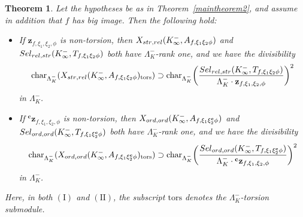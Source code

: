 \documentclass[10pt,letterpaper]{amsart}
\theoremstyle{plain}
\newtheorem{thm}{Theorem}[subsection] %
\theoremstyle{definition}
\theoremstyle{definition}
\theoremstyle{plain}
\theoremstyle{plain}
\theoremstyle{plain}
\theoremstyle{remark}
\numberwithin{equation}{section}
\newcommand{\cc}{\mathbf{c}}
\newcommand{\Sel}{Sel}
\newcommand{\relstr}{{{\rm rel},{\rm str}}}
\newcommand{\strrel}{{{\rm str},{\rm rel}}}
\newcommand{\ord}{{{\rm ord},{\rm ord}}}
\def\Sel{{\rm Sel}}
\begin{document}
\begin{thm}\label{thm:IMC-general}
Let the hypotheses be as in Theorem~\ref{maintheorem2}, and assume in addition that $f$ has big image. Then the following hold:
\begin{itemize}
\item[(I)] If $\mathbf{z}_{f,\xi_1,\xi_2,\phi}$ is non-torsion, then $X_{\strrel}(K_\infty^-,A_{f,\xi_1\xi_2\phi})$ and $\Sel_{\relstr}(K_\infty^-,T_{f,\xi_1\xi_2\phi})$ both have $\Lambda_K^-$-rank one, and we have the divisibility
\[
{\mathrm{char}}_{\Lambda_K^-}(X_{\strrel}(K_\infty^-,A_{f,\xi_1\xi_2\phi})_{\mathrm{tors}})\supset{\mathrm{char}}_{\Lambda_K^-}\biggl(\frac{\Sel_{\relstr}(K_\infty^-,T_{f,\xi_1\xi_2\phi})}{\Lambda_K^-\cdot\mathbf{z}_{f,\xi_1,\xi_2,\phi}}\biggr)^2
\]
in $\Lambda_K^-$. %
\item[(II)] If ${}^{\cc}\mathbf{z}_{f,\xi_1,\xi_2,\phi}$ is non-torsion, then $X_{\ord}(K_\infty^-,A_{f,\xi_1\xi_2^\cc\phi})$ and $\Sel_{\ord}(K_\infty^-,T_{f,\xi_1\xi_2^\cc\phi})$ both have $\Lambda_K^-$-rank one, and we have the divisibility
\[
{\mathrm{char}}_{\Lambda_K^-}(X_{\ord}(K_\infty^-,A_{f,\xi_1\xi_2^\cc\phi})_{\mathrm{tors}})\supset{\mathrm{char}}_{\Lambda_K^-}\biggl(\frac{\Sel_{\ord}(K_\infty^-,T_{f,\xi_1\xi_2^\cc\phi})}{\Lambda_K^-\cdot{}^{\cc}\mathbf{z}_{f,\xi_1,\xi_2,\phi}}\biggr)^2
\]
in $\Lambda_K^-$. %
\end{itemize}
Here, in both $({\mathrm{I}})$ and $({\mathrm{II}})$, the subscript ${\mathrm{tors}}$ denotes the $\Lambda_K^-$-torsion submodule.
\end{thm}
\end{document}
